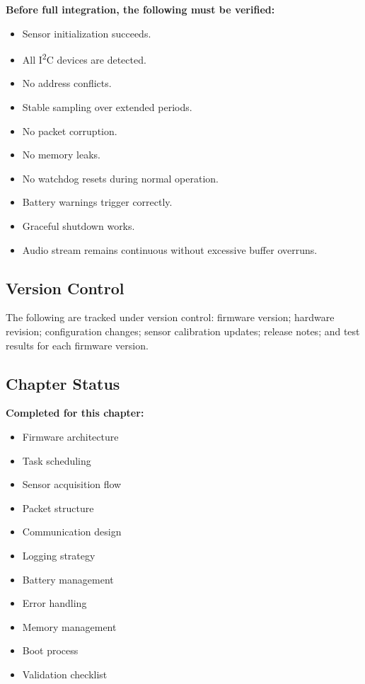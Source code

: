 \begin{requirementbox}
\textbf{Before full integration, the following must be verified:}
\begin{itemize}
    \item Sensor initialization succeeds.
    \item All I\textsuperscript{2}C devices are detected.
    \item No address conflicts.
    \item Stable sampling over extended periods.
    \item No packet corruption.
    \item No memory leaks.
    \item No watchdog resets during normal operation.
    \item Battery warnings trigger correctly.
    \item Graceful shutdown works.
    \item Audio stream remains continuous without excessive buffer overruns.
\end{itemize}
\end{requirementbox}

\subsection{Version Control}
\label{sec:version-control-ch6}

The following are tracked under version control: firmware version; hardware revision; configuration changes; sensor calibration updates; release notes; and test results for each firmware version.

\subsection{Chapter Status}
\label{sec:ch6-status}

\begin{validationbox}
\textbf{Completed for this chapter:}
\begin{itemize}
    \item Firmware architecture
    \item Task scheduling
    \item Sensor acquisition flow
    \item Packet structure
    \item Communication design
    \item Logging strategy
    \item Battery management
    \item Error handling
    \item Memory management
    \item Boot process
    \item Validation checklist
\end{itemize}
\end{validationbox}
